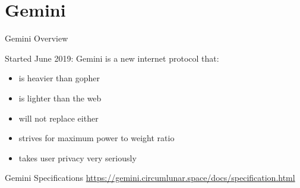 \documentclass[presentation, 11pt,  aspectratio=169]{beamer}
\begin{document}
\section*{Gemini}
\label{sec:orgca48a6f}
\begin{frame}[label={sec:org79edcb9}]{Gemini Overview}
\begin{block}{Started June 2019: Gemini is a new internet protocol that:}
\begin{itemize}
\item is heavier than gopher\\
\item is lighter than the web\\
\item will not replace either\\
\item strives for maximum power to weight ratio\\
\item takes user privacy very seriously\\
\end{itemize}
\pause
\end{block}

\begin{block}{Gemini Specifications}
\url{https://gemini.circumlunar.space/docs/specification.html}\\
\end{block}
\end{frame}
\end{document}
